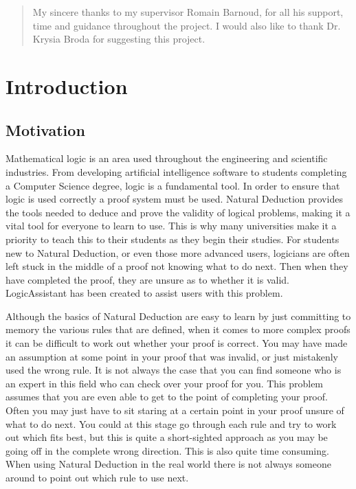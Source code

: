 \vspace*{\fill}

\pagebreak
\vspace*{\fill}
\afterpage{\blankpage}
\renewcommand{\abstractname}{\large Acknowledgements}

\begin{abstract}

	\noindent
	My sincere thanks to my supervisor Romain Barnoud, for all his support, time and guidance throughout the project. I would also like to thank Dr. Krysia Broda for suggesting this project.
\end{abstract}
\vspace*{\fill}

\pagebreak

\tableofcontents
\pagebreak

\clearpage\null\newpage



\section{Introduction}

\subsection{Motivation}

Mathematical logic is an area used throughout the engineering and scientific industries. From developing artificial intelligence software to students completing a Computer Science degree, logic is a fundamental tool. In order to ensure that logic is used correctly a proof system must be used. Natural Deduction provides the tools needed to deduce and prove the validity of logical problems, making it a vital tool for everyone to learn to use. This is why many universities make it a priority to teach this to their students as they begin their studies. For students new to Natural Deduction, or even those more advanced users, logicians are often left stuck in the middle of a proof not knowing what to do next. Then when they have completed the proof, they are unsure as to whether it is valid. LogicAssistant has been created to assist users with this problem.

Although the basics of Natural Deduction are easy to learn by just committing to memory the various rules that are defined, when it comes to more complex proofs it can be difficult to work out whether your proof is correct. You may have made an assumption at some point in your proof that was invalid, or just mistakenly used the wrong rule. It is not always the case that you can find someone who is an expert in this field who can check over your proof for you. This problem assumes that you are even able to get to the point of completing your proof. Often you may just have to sit staring at a certain point in your proof unsure of what to do next. You could at this stage go through each rule and try to work out which fits best, but this is quite a short-sighted approach as you may be going off in the complete wrong direction. This is also quite time consuming. When using Natural Deduction in the real world there is not always someone around to point out which rule to use next. 


